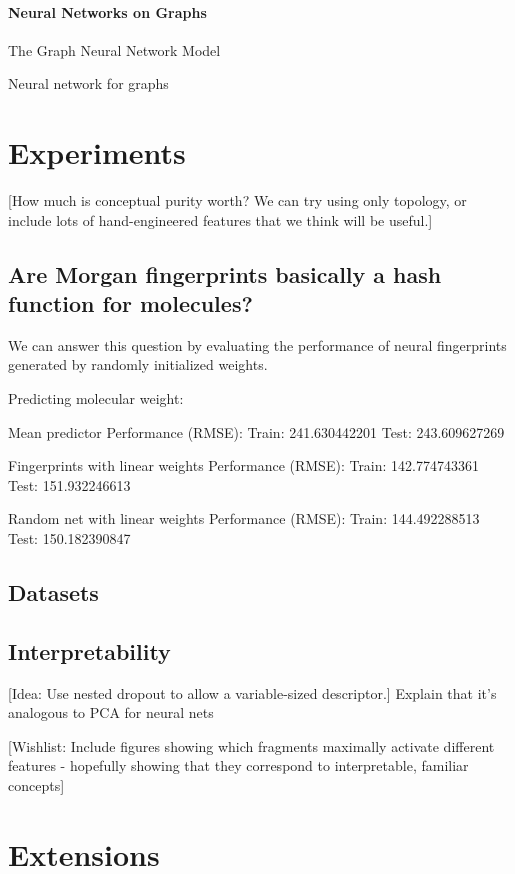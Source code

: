 \documentclass{article} %
\begin{document}
\paragraph{Neural Networks on Graphs}

\cite{graphnn2009} The Graph Neural Network Model

\cite{micheli2009neural} Neural network for graphs



\section{Experiments}

[How much is conceptual purity worth?  We can try using only topology, or include lots of hand-engineered features that we think will be useful.]

\subsection{Are Morgan fingerprints basically a hash function for molecules?}

We can answer this question by evaluating the performance of neural fingerprints generated by randomly initialized weights.


Predicting molecular weight:

Mean predictor
Performance (RMSE):
Train: 241.630442201
Test:  243.609627269

Fingerprints with linear weights
Performance (RMSE):
Train: 142.774743361
Test:  151.932246613

Random net with linear weights
Performance (RMSE):
Train: 144.492288513
Test:  150.182390847



\subsection{Datasets}

\subsection{Interpretability}
[Idea: Use nested dropout to allow a variable-sized descriptor.]
Explain that it's analogous to PCA for neural nets

[Wishlist: Include figures showing which fragments maximally activate different features - hopefully showing that they correspond to interpretable, familiar concepts]


\section{Extensions}
\end{document}
